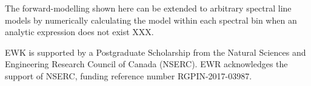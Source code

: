 \documentclass{rnaastex}
\begin{document}
The forward-modelling shown here can be extended to arbitrary spectral line models by numerically calculating the model within each spectral bin when an analytic expression does not exist XXX.


\acknowledgments

EWK is supported by a Postgraduate Scholarship from the Natural Sciences and Engineering Research Council of Canada (NSERC). EWR acknowledges the support of NSERC, funding reference number RGPIN-2017-03987.

\software{}

\begin{thebibliography}{}

\end{thebibliography}
\end{document}
